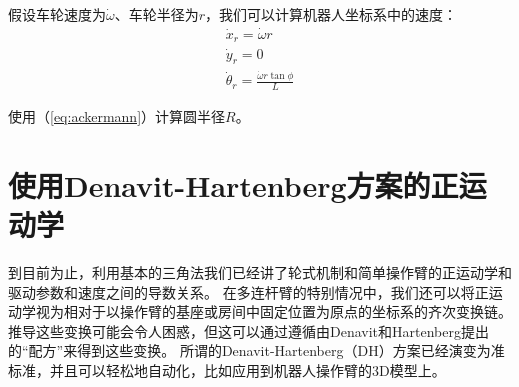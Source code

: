
假设车轮速度为$\dot{\omega}$、车轮半径为$r$，我们可以计算机器人坐标系中的速度：
\begin{eqnarray}
\dot{x}_r=\dot{\omega}r\\
\dot{y}_r=0\\
\dot{\theta}_r=\frac{\dot{\omega}r\tan\phi}{L}
\end{eqnarray}

使用（\ref{eq:ackermann}）计算圆半径$R$。

\section{使用Denavit-Hartenberg方案的正运动学}


到目前为止，利用基本的三角法我们已经讲了轮式机制和简单操作臂的正运动学和驱动参数和速度之间的导数关系。 在多连杆臂的特别情况中，我们还可以将正运动学视为相对于以操作臂的基座或房间中固定位置为原点的坐标系的齐次变换链。 推导这些变换可能会令人困惑，但这可以通过遵循由Denavit和Hartenberg提出的“配方”来得到这些变换。 所谓的Denavit-Hartenberg（DH）方案已经演变为准标准，并且可以轻松地自动化，比如应用到机器人操作臂的3D模型上。


